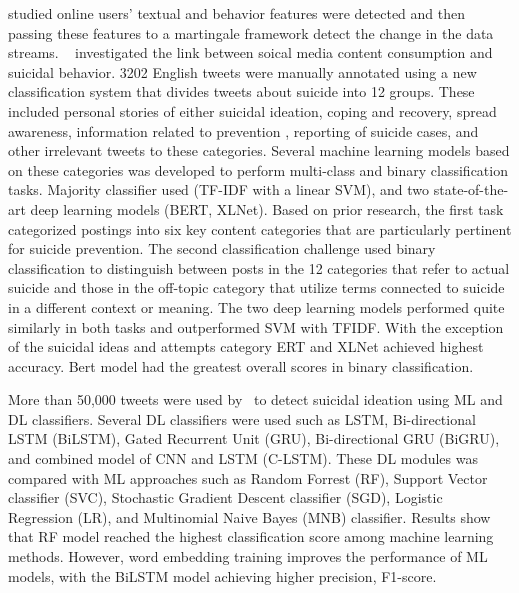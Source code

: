 \documentclass[11pt]{article}
\begin{document}
 

\citet{36n8269767} studied online users’ textual and behavior features were detected and then passing these features to a martingale framework detect the change in the data streams.
~\cite{info:doi/10.2196/34705} investigated the link between soical media content consumption and suicidal behavior. 3202 English tweets were manually annotated using a new classification system that divides tweets about suicide into 12 groups. These included personal stories of either suicidal ideation,  coping and recovery, spread awareness, information related to prevention , reporting of suicide cases, and other irrelevant tweets to these categories. Several machine learning models based on these categories was developed to perform multi-class and binary classification tasks. Majority classifier used (TF-IDF with a linear SVM), and two state-of-the-art deep learning models (BERT, XLNet). Based on prior research, the first task categorized postings into six key content categories that are particularly pertinent for suicide prevention. The second classification challenge used binary classification to distinguish between posts in the 12 categories that refer to actual suicide and those in the off-topic category that utilize terms connected to suicide in a different context or meaning. The two deep learning models performed quite similarly in both tasks and outperformed SVM with TFIDF. With the exception of the suicidal ideas and attempts category ERT and XLNet achieved highest accuracy. Bert model had the greatest overall scores in binary classification.


More than 50,000 tweets were used by~\cite{technologies10030057} to detect suicidal ideation using ML and DL classifiers.%
Several DL classifiers were used such as LSTM, Bi-directional LSTM (BiLSTM), Gated Recurrent Unit (GRU), Bi-directional GRU (BiGRU), and combined model of CNN and LSTM (C-LSTM). These DL modules was compared with ML approaches such as Random Forrest (RF), Support Vector classifier (SVC), Stochastic Gradient Descent classifier (SGD), Logistic Regression (LR), and Multinomial Naive Bayes (MNB) classifier. Results show that RF model %
reached the highest classification score among machine learning methods. However, word embedding training improves the performance of ML models, with the BiLSTM model achieving higher  precision, F1-score.%
\end{document}
